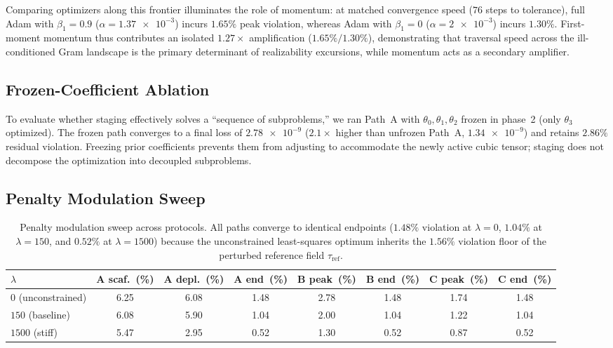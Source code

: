 \documentclass[preprint,aps,prb,longbibliography,superscriptaddress]{revtex4-2}
\newcommand{\tref}{\tau_{\text{ref}}}
\begin{document}
Comparing optimizers along this frontier illuminates the role of momentum:
at matched convergence speed ($76$ steps to tolerance), full Adam with $\beta_1 = 0.9$
($\alpha = \num{1.37e-3}$) incurs $1.65\%$ peak violation, whereas Adam with
$\beta_1 = 0$ ($\alpha = \num{2e-3}$) incurs $1.30\%$. First-moment momentum
thus contributes an isolated $1.27\times$ amplification ($1.65\% / 1.30\%$),
demonstrating that traversal speed across the ill-conditioned Gram landscape is
the primary determinant of realizability excursions, while momentum acts as a
secondary amplifier.

\subsection{Frozen-Coefficient Ablation}\label{sec:frozen}

To evaluate whether staging effectively solves a ``sequence of subproblems,''
we ran Path~A with $\theta_0, \theta_1, \theta_2$ frozen in phase~2 (only
$\theta_3$ optimized). The frozen path converges to a final loss of
$\num{2.78e-9}$ ($2.1\times$ higher than unfrozen Path~A, $\num{1.34e-9}$)
and retains $2.86\%$ residual violation. Freezing prior coefficients prevents
them from adjusting to accommodate the newly active cubic tensor; staging
does not decompose the optimization into decoupled subproblems.

\subsection{Penalty Modulation Sweep}\label{sec:sweep}

\begin{table}[t]
\caption{Penalty modulation sweep across protocols. All paths converge to
  identical endpoints ($1.48\%$ violation at $\lambda = 0$, $1.04\%$ at $\lambda = 150$,
  and $0.52\%$ at $\lambda = 1500$) because the unconstrained least-squares
  optimum inherits the $1.56\%$ violation floor of the perturbed reference field $\tref$.}\label{tab:sweep}
\begin{ruledtabular}
\begin{tabular}{lccccccc}
  $\lambda$ & A scaf.\ (\%) & A depl.\ (\%) & A end\ (\%) & B peak\ (\%) & B end\ (\%) & C peak\ (\%) & C end\ (\%) \\
  \midrule
  $0$ (unconstrained) & 6.25 & 6.08 & 1.48 & 2.78 & 1.48 & 1.74 & 1.48 \\
  $150$ (baseline)    & 6.08 & 5.90 & 1.04 & 2.00 & 1.04 & 1.22 & 1.04 \\
  $1500$ (stiff)      & 5.47 & 2.95 & 0.52 & 1.30 & 0.52 & 0.87 & 0.52 \\
\end{tabular}
\end{ruledtabular}
\end{table}
\end{document}
